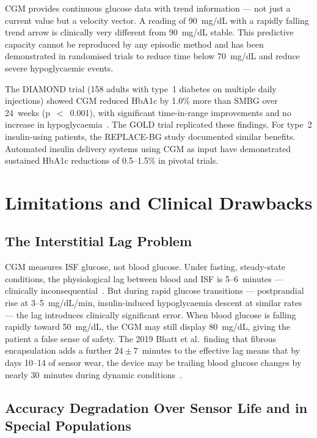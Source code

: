 CGM provides continuous glucose data with trend information --- not just a current value but a velocity vector. A reading of 90~mg/dL with a rapidly falling trend arrow is clinically very different from 90~mg/dL stable. This predictive capacity cannot be reproduced by any episodic method and has been demonstrated in randomised trials to reduce time below 70~mg/dL and reduce severe hypoglycaemic events.

The DIAMOND trial (158 adults with type~1 diabetes on multiple daily injections) showed CGM reduced HbA1c by 1.0\% more than SMBG over 24~weeks (p~$<$~0.001), with significant time-in-range improvements and no increase in hypoglycaemia~\cite{diamond2017}. The GOLD trial replicated these findings. For type~2 insulin-using patients, the REPLACE-BG study documented similar benefits. Automated insulin delivery systems using CGM as input have demonstrated sustained HbA1c reductions of 0.5--1.5\% in pivotal trials.

\section{Limitations and Clinical Drawbacks}

\subsection*{The Interstitial Lag Problem}

CGM measures ISF glucose, not blood glucose. Under fasting, steady-state conditions, the physiological lag between blood and ISF is 5--6~minutes --- clinically inconsequential~\cite{basu2013lag}. But during rapid glucose transitions --- postprandial rise at 3--5~mg/dL/min, insulin-induced hypoglycaemia descent at similar rates --- the lag introduces clinically significant error. When blood glucose is falling rapidly toward 50~mg/dL, the CGM may still display 80~mg/dL, giving the patient a false sense of safety. The 2019 Bhatt et al.\ finding that fibrous encapsulation adds a further $24 \pm 7$~minutes to the effective lag means that by days 10--14 of sensor wear, the device may be trailing blood glucose changes by nearly 30~minutes during dynamic conditions~\cite{bhatt2019lag}.

\subsection*{Accuracy Degradation Over Sensor Life and in Special Populations}

